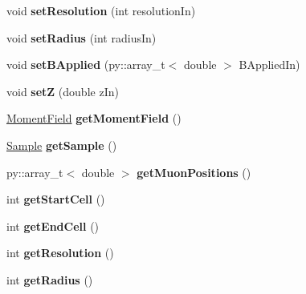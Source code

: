 \begin{DoxyCompactItemize}
void {\bfseries set\+Resolution} (int resolution\+In)
\item 
\mbox{\label{class_vector_field_creator_a69f56a5513463260644b495ee031c942}} 
void {\bfseries set\+Radius} (int radius\+In)
\item 
\mbox{\label{class_vector_field_creator_a5be4c7c6864ff1fcfedfc6015f262612}} 
void {\bfseries set\+B\+Applied} (py\+::array\+\_\+t$<$ double $>$ B\+Applied\+In)
\item 
\mbox{\label{class_vector_field_creator_a348e21dda6051f9690d4c433d2ce34b1}} 
void {\bfseries setZ} (double z\+In)
\item 
\mbox{\label{class_vector_field_creator_aea762facca48f01bf0dd37919d5de2da}} 
\mbox{\hyperlink{class_moment_field}{Moment\+Field}} {\bfseries get\+Moment\+Field} ()
\item 
\mbox{\label{class_vector_field_creator_a7fc2f451b4d17c95d5b4908fdcb8d4e1}} 
\mbox{\hyperlink{class_sample}{Sample}} {\bfseries get\+Sample} ()
\item 
\mbox{\label{class_vector_field_creator_a99ee9e6c0eb7944b8874ede4bddf3bcf}} 
py\+::array\+\_\+t$<$ double $>$ {\bfseries get\+Muon\+Positions} ()
\item 
\mbox{\label{class_vector_field_creator_ac97a99e13b79a64367bc1093f5506271}} 
int {\bfseries get\+Start\+Cell} ()
\item 
\mbox{\label{class_vector_field_creator_a925c9dfa8a29762d50b32075755a0979}} 
int {\bfseries get\+End\+Cell} ()
\item 
\mbox{\label{class_vector_field_creator_a5e334812abcf356bfbfb9dcce522a96f}} 
int {\bfseries get\+Resolution} ()
\item 
\mbox{\label{class_vector_field_creator_a676bbd0635e62ed7b196420e84b99de5}} 
int {\bfseries get\+Radius} ()
\item 

\end{DoxyCompactItemize}
